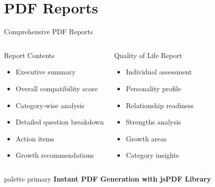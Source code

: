 \documentclass[aspectratio=169]{beamer}
\begin{document}
\section{PDF Reports}
\begin{frame}{Comprehensive PDF Reports}
    \begin{columns}[T]
        \begin{block}{Report Contents}
            \begin{itemize}
                \item Executive summary
                \item Overall compatibility score
                \item Category-wise analysis
                \item Detailed question breakdown
                \item Action items
                \item Growth recommendations
            \end{itemize}
        \end{block}
        
        \begin{block}{Quality of Life Report}
            \begin{itemize}
                \item Individual assessment
                \item Personality profile
                \item Relationship readiness
                \item Strengths analysis
                \item Growth areas
                \item Category insights
            \end{itemize}
        \end{block}
    \end{columns}
    
    \vspace{0.4cm}
    \begin{center}
        \begin{beamercolorbox}[wd=0.8\textwidth,sep=8pt,center,rounded=true,shadow=true]{palette primary}
            \color{white} \textbf{Instant PDF Generation with jsPDF Library}
        \end{beamercolorbox}
    \end{center}
\end{frame}
\end{document}
